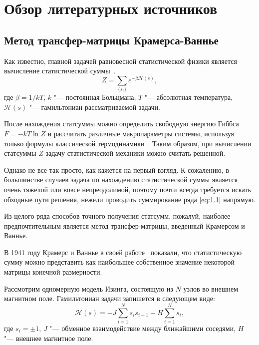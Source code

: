 \chapter{Обзор литературных источников}\label{ch:ch1}

\section{Метод трансфер-матрицы Крамерса-Ваннье}\label{sec:ch1/sec1}

Как известно, главной задачей равновесной статистической физики является вычисление статистической суммы~\cite{feynmann1972, isihara1973, huang1973, kubo1967}.
\begin{equation}
Z=\sum_{\{s_{i}\}}e^{-\beta \mathcal{H}(s)}, 
\label{eq:1.1}
\end{equation}
где $\beta = 1/kT$, $k$ "--- постоянная Больцмана, $T$ "--- абсолютная температура, $\mathcal{H}(s)$ "--- гамильтониан рассматриваемой задачи.

После нахождения статсуммы можно определить свободную энергию Гиббса $F=-kT \ln Z$ и рассчитать различные макропараметры системы, используя только формулы классической термодинамики~\cite{feynmann1972, isihara1973, huang1973, kubo1967}. Таким образом, при вычислении статсуммы $Z$ задачу статистической механики можно считать решенной.

Однако не все так просто, как кажется на первый взгляд. К сожалению, в большинстве случаев задача по нахождению статистической суммы является очень тяжелой или вовсе непреодолимой, поэтому почти всегда требуется искать обходные пути решения, нежели проводить суммирование ряда \eqref{eq:1.1} напрямую.

Из целого ряда способов точного получения статсумм, пожалуй, наиболее предпочтительным является метод трансфер-матрицы, введенный Крамерсом и Ваннье. 

В 1941 году Крамерс и Ваннье в своей работе~\cite{kramers_wannier1,kramers_wannier2} показали, что статистическую сумму можно представить как наибольшее собственное значение некоторой матрицы конечной размерности.

Рассмотрим одномерную модель Изинга, состоящую из $N$ узлов во внешнем магнитном поле. Гамильтониан задачи запишется в следующем виде:
\begin{equation}
\mathcal{H}(s) = -J\sum_{i=1}^{N} s_{i}s_{i+1}-H\sum_{i=1}^{N} s_{i},
\label{eq:1.2}
\end{equation}
где $s_{i}=\pm 1$, $J$ "--- обменное взаимодействие между ближайшими соседями,
$H$ "--- внешнее магнитное поле.


